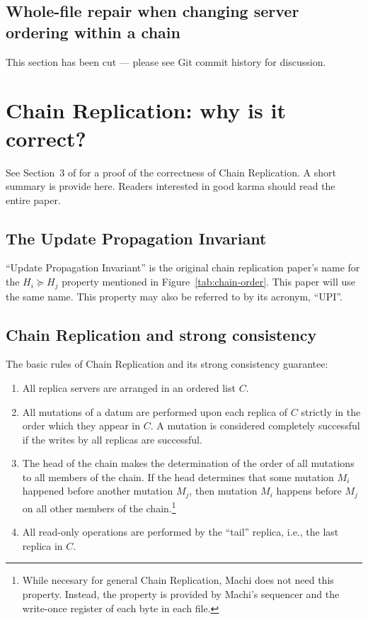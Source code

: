 \documentclass[preprint,10pt]{sigplanconf}
\begin{document}
\subsection{Whole-file repair when changing server ordering within a chain}
\label{sub:repair-chain-re-ordering}

This section has been cut --- please see Git commit history for discussion.

\section{Chain Replication: why is it correct?}
\label{sec:cr-proof}

See Section~3 of \cite{chain-replication} for a proof of the
correctness of Chain Replication.  A short summary is provide here.
Readers interested in good karma should read the entire paper.

\subsection{The Update Propagation Invariant}
\label{sub:upi}

``Update Propagation Invariant'' is the original chain replication
paper's name for the
$H_i \succeq H_j$
property mentioned in Figure~\ref{tab:chain-order}.
This paper will use the same name.
This property may also be referred to by its acronym, ``UPI''.

\subsection{Chain Replication and strong consistency}

The basic rules of Chain Replication and its strong
consistency guarantee:

\begin{enumerate}

\item All replica servers are arranged in an ordered list $C$.

\item All mutations of a datum are performed upon each replica of $C$
  strictly in the order which they appear in $C$.  A mutation is considered
  completely successful if the writes by all replicas are successful.

\item The head of the chain makes the determination of the order of
  all mutations to all members of the chain.  If the head determines
  that some mutation $M_i$ happened before another mutation $M_j$,
  then mutation $M_i$ happens before $M_j$ on all other members of
  the chain.\footnote{While necesary for general Chain Replication,
    Machi does not need this property.  Instead, the property is
    provided by Machi's sequencer and the write-once register of each
    byte in each file.}

\item All read-only operations are performed by the ``tail'' replica,
  i.e., the last replica in $C$.

\end{enumerate}
\end{document}
